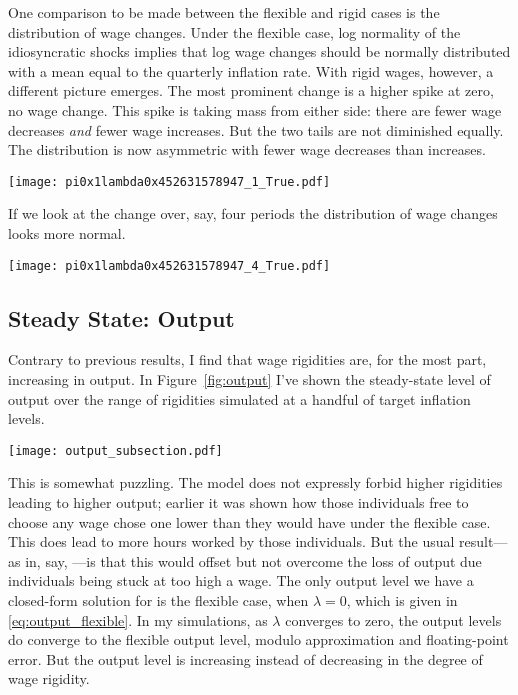 \documentclass[12pt,a4paper]{scrartcl}            %
\begin{document}
One comparison to be made between the flexible and rigid cases is the distribution of wage changes.
Under the flexible case, log normality of the idiosyncratic shocks implies that log wage changes should be normally distributed with a mean equal to the quarterly inflation rate.
With rigid wages, however, a different picture emerges.
The most prominent change is a higher spike at zero, no wage change.
This spike is taking mass from either side: there are fewer wage decreases \emph{and} fewer wage increases.
But the two tails are not diminished equally.
The distribution is now asymmetric with fewer wage decreases than increases.
\begin{center}
  \texttt{[image: pi0x1lambda0x452631578947\_1\_True.pdf]}
  \label{fig:dist_1_periods}
\end{center}

If we look at the change over, say, four periods the distribution of wage changes looks more normal.

\begin{center}
  \texttt{[image: pi0x1lambda0x452631578947\_4\_True.pdf]}
  \label{fig:dist_4_periods}
\end{center}


\subsection{Steady State: Output}
\label{sub:steady_state_output}

Contrary to previous results, I find that wage rigidities are, for the most part, increasing in output.
In Figure~\ref{fig:output} I've shown the steady-state level of output over the range of rigidities simulated at a handful of target inflation levels.

\begin{center}
  \texttt{[image: output\_subsection.pdf]}
  \label{fig:output}
\end{center}

This is somewhat puzzling.
The model does not expressly forbid higher rigidities leading to higher output;
earlier it was shown how those individuals free to choose any wage chose one lower than they would have under the flexible case.
This does lead to more hours worked by those individuals.
But the usual result---as in, say, \cite{daly_hobijn_2013}---is that this would offset but not overcome the loss of output due individuals being stuck at too high a wage.
The only output level we have a closed-form solution for is the flexible case, when $\lambda = 0$, which is given in \eqref{eq:output_flexible}.
In my simulations, as $\lambda$ converges to zero, the output levels do converge to the flexible output level, modulo approximation and floating-point error.
But the output level is increasing instead of decreasing in the degree of wage rigidity.
\end{document}
